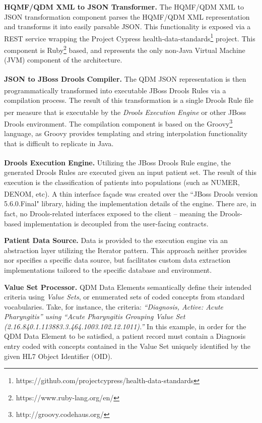 \documentclass{amia}
\begin{document}
\textbf{HQMF/QDM XML to JSON Transformer.}
The HQMF/QDM XML to JSON transformation component parses the HQMF/QDM XML representation and transforms it into easily parsable JSON. This functionality is exposed via a REST service wrapping the Project Cypress health-data-standards\footnote{https://github.com/projectcypress/health-data-standards} project. This component is Ruby\footnote{https://www.ruby-lang.org/en/} based, and represents the only non-Java Virtual Machine (JVM) component of the architecture.

\textbf{JSON to JBoss\textsuperscript{\textregistered} Drools Compiler.}
The QDM JSON representation is then programmatically transformed into executable JBoss\textsuperscript{\textregistered} Drools Rules via a compilation process. The result of this transformation is a single Drools Rule file per measure that is executable by the \textit{Drools Execution Engine} or other JBoss\textsuperscript{\textregistered} Drools environment. The compilation component is based on the Groovy\footnote{http://groovy.codehaus.org/} language, as Groovy provides templating and string interpolation functionality that is difficult to replicate in Java.

\textbf{Drools Execution Engine.}
Utilizing the JBoss\textsuperscript{\textregistered} Drools Rule engine, the generated Drools Rules are executed given an input patient set. The result of this execution is the classification of patients into populations (such as NUMER, DENOM, etc). A thin interface fa\c{c}ade was created over the ``JBoss\textsuperscript{\textregistered} Drools version 5.6.0.Final" library, hiding the implementation details of the engine. There are, in fact, no Drools-related interfaces exposed to the client -- meaning the Drools-based implementation is decoupled from the user-facing contracts.%

\textbf{Patient Data Source.}
Data is provided to the execution engine via an abstraction layer utilizing the Iterator pattern\cite{gamma1993design}. This approach neither provides nor specifies a specific data source, but facilitates custom data extraction implementations tailored to the specific database and environment.

\textbf{Value Set Processor.}
QDM Data Elements semantically define their intended criteria using \textit{Value Sets}, or enumerated sets of coded concepts from standard vocabularies. Take, for instance, the criteria:
\textit{``Diagnosis, Active: Acute Pharyngitis'' using ``Acute Pharyngitis Grouping Value Set (2.16.840.1.113883.3.464.1003.102.12.1011).''}
In this example, in order for the QDM Data Element to be satisfied, a patient record must contain a Diagnosis entry coded with concepts contained in the Value Set uniquely identified by the given HL7 Object Identifier (OID)\cite{steindel2010oids}.
\end{document}
